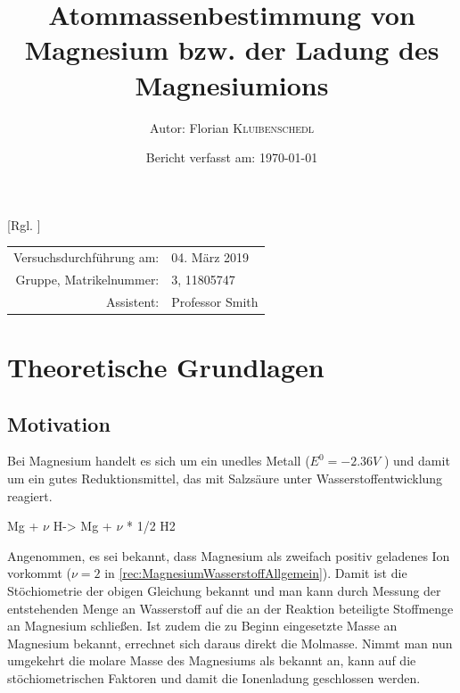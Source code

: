 \documentclass{article}
\title{Atommassenbestimmung von Magnesium bzw. der Ladung des Magnesiumions} %
\author{Autor: Florian \textsc{Kluibenschedl}} %
\date{Bericht verfasst am: \today} %
\begin{document}
  [Rgl. ]{}{}
  
  \maketitle %
  
  \begin{center}
    \begin{tabular}{r l}
      Versuchsdurchführung am: & 04. März 2019\\ %
      Gruppe, Matrikelnummer: & 3, 11805747 \\
      Assistent: & Professor Smith %
    \end{tabular}
  \end{center}


  \begin{abstract}
    
  \end{abstract}
  
  \section{Theoretische Grundlagen}
  
    \subsection{Motivation} \label{sec:Motivation}
  Bei Magnesium handelt es sich um ein unedles Metall ($E^{0} = -2.36 V$ \cite[S. 881]{PhysicalChemistryAtkings}) und damit um ein gutes Reduktionsmittel, das mit Salzsäure unter Wasserstoffentwicklung reagiert.   

  \begin{reaction}
    Mg\sld{} + $\nu$ H\pch\aq -> Mg\pch[$\nu$] \aq{} + $\nu$ * 1/2 H2\gas{} \label{rec:MagnesiumWasserstoffAllgemein}
  \end{reaction}
  
  Angenommen, es sei bekannt, dass Magnesium als zweifach positiv geladenes Ion vorkommt ($\nu = 2$ in \ref{rec:MagnesiumWasserstoffAllgemein}). Damit ist die Stöchiometrie der obigen Gleichung bekannt und man kann durch Messung der entstehenden Menge an Wasserstoff auf die an der Reaktion beteiligte Stoffmenge an Magnesium schließen. Ist zudem die zu Beginn eingesetzte Masse an Magnesium bekannt, errechnet sich daraus direkt die Molmasse. Nimmt man nun umgekehrt die molare Masse des Magnesiums als bekannt an, kann auf die stöchiometrischen Faktoren und damit die Ionenladung geschlossen werden. 
  
\end{document}
